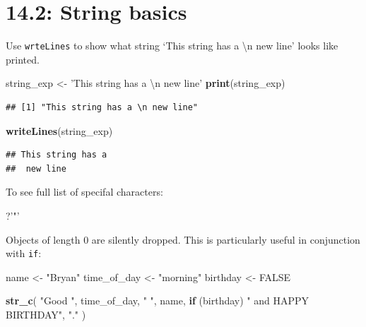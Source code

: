 \documentclass[]{book}
\newenvironment{Shaded}{\begin{snugshade}}{\end{snugshade}}
\newcommand{\CharTok}[1]{\textcolor[rgb]{0.31,0.60,0.02}{#1}}
\newcommand{\ControlFlowTok}[1]{\textcolor[rgb]{0.13,0.29,0.53}{\textbf{#1}}}
\newcommand{\KeywordTok}[1]{\textcolor[rgb]{0.13,0.29,0.53}{\textbf{#1}}}
\newcommand{\NormalTok}[1]{#1}
\newcommand{\OtherTok}[1]{\textcolor[rgb]{0.56,0.35,0.01}{#1}}
\newcommand{\StringTok}[1]{\textcolor[rgb]{0.31,0.60,0.02}{#1}}
\theoremstyle{definition}
\theoremstyle{definition}
\theoremstyle{definition}
\theoremstyle{remark}
\begin{document}
\hypertarget{string-basics}{%
\section{14.2: String basics}\label{string-basics}}

Use \texttt{wrteLines} to show what string `This string has a
\textbackslash{}n new line' looks like printed.

\begin{Shaded}
\begin{Highlighting}[]
\NormalTok{string_exp <-}\StringTok{ 'This string has a }\CharTok{\textbackslash{}n}\StringTok{ new line'}
\KeywordTok{print}\NormalTok{(string_exp)}
\end{Highlighting}
\end{Shaded}

\begin{verbatim}
## [1] "This string has a \n new line"
\end{verbatim}

\begin{Shaded}
\begin{Highlighting}[]
\KeywordTok{writeLines}\NormalTok{(string_exp)}
\end{Highlighting}
\end{Shaded}

\begin{verbatim}
## This string has a 
##  new line
\end{verbatim}

To see full list of specifal characters:

\begin{Shaded}
\begin{Highlighting}[]
\NormalTok{?}\StringTok{'"'}
\end{Highlighting}
\end{Shaded}

Objects of length 0 are silently dropped. This is particularly useful in
conjunction with \texttt{if}:

\begin{Shaded}
\begin{Highlighting}[]
\NormalTok{name <-}\StringTok{ "Bryan"}
\NormalTok{time_of_day <-}\StringTok{ "morning"}
\NormalTok{birthday <-}\StringTok{ }\OtherTok{FALSE}

\KeywordTok{str_c}\NormalTok{(}
  \StringTok{"Good "}\NormalTok{, time_of_day, }\StringTok{" "}\NormalTok{, name,}
  \ControlFlowTok{if}\NormalTok{ (birthday) }\StringTok{" and HAPPY BIRTHDAY"}\NormalTok{,}
  \StringTok{"."}
\NormalTok{)}
\end{Highlighting}
\end{Shaded}
\end{document}
